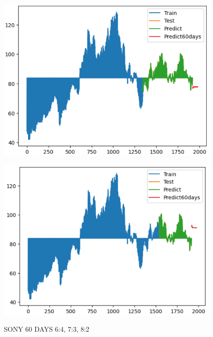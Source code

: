 \documentclass{article}
\begin{document}
\begin{multicols}{2}
\begin{figure}[H]
\begin{minipage}{0.15\textwidth}
    \label{fig:1}
    \end{minipage}%
    \begin{minipage}{0.15\textwidth}
    \centering
    \includegraphics[width=1\textwidth]{Image/XGBoost/SONY_7_3_60.png}
  
    \label{fig:2}
    \end{minipage}%
    \begin{minipage}{0.15\textwidth}
    \centering
    \includegraphics[width=1\textwidth]{Image/XGBoost/SONY_8_2_60.png}

    \label{fig:3}
    \end{minipage}
    \caption{SONY 60 DAYS  6:4, 7:3, 8:2 }
\end{figure}


\end{multicols}
\end{document}
